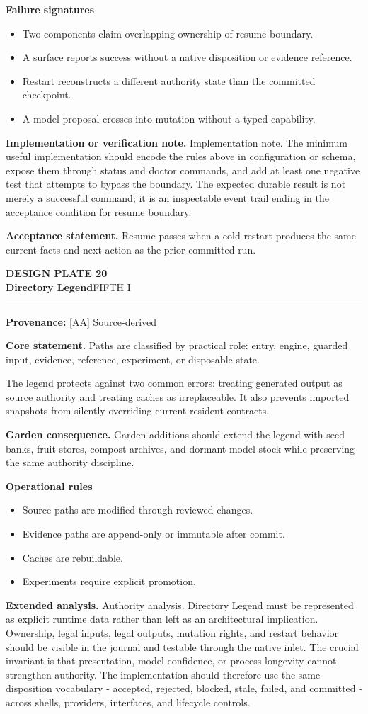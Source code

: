 \documentclass[10pt,letterpaper,oneside]{article}
\newcommand{\prov}[1]{\textcolor{gardenBlue}{\sffamily\footnotesize\textbf{Provenance:} #1}}
\newcommand{\platetitle}[3]{%
  \begin{minipage}[t][0.54in][t]{\textwidth}
  {\sffamily\bfseries\color{gardenDeep}\fontsize{9}{10}\selectfont DESIGN PLATE #1}\\[-1pt]
  {\sffamily\bfseries\color{gardenInk}\fontsize{16.5}{18}\selectfont #2}\hfill{\sffamily\color{gardenGreen}\large #3}
  \end{minipage}\vspace{-2pt}\hrule\vspace{5pt}}
\begin{document}
\textbf{Failure signatures}
\begin{itemize}
\item Two components claim overlapping ownership of resume boundary.
\item A surface reports success without a native disposition or evidence reference.
\item Restart reconstructs a different authority state than the committed checkpoint.
\item A model proposal crosses into mutation without a typed capability.
\end{itemize}
\textbf{Implementation or verification note.} Implementation note. The minimum useful implementation should encode the rules above in configuration or schema, expose them through status and doctor commands, and add at least one negative test that attempts to bypass the boundary. The expected durable result is not merely a successful command; it is an inspectable event trail ending in the acceptance condition for resume boundary.

\begin{acceptbox}
\textbf{Acceptance statement.} Resume passes when a cold restart produces the same current facts and next action as the prior committed run.
\end{acceptbox}
\newpage
\platetitle{20}{Directory Legend}{FIFTH I}
\prov{[AA] Source-derived}
\fontsize{8.85}{10.45}\selectfont
\begin{corebox}
\textbf{Core statement.} Paths are classified by practical role: entry, engine, guarded input, evidence, reference, experiment, or disposable state.
\end{corebox}
The legend protects against two common errors: treating generated output as source authority and treating caches as irreplaceable. It also prevents imported snapshots from silently overriding current resident contracts.

\textbf{Garden consequence.} Garden additions should extend the legend with seed banks, fruit stores, compost archives, and dormant model stock while preserving the same authority discipline.

\textbf{Operational rules}
\begin{itemize}
\item Source paths are modified through reviewed changes.
\item Evidence paths are append-only or immutable after commit.
\item Caches are rebuildable.
\item Experiments require explicit promotion.
\end{itemize}
\textbf{Extended analysis.} Authority analysis. Directory Legend must be represented as explicit runtime data rather than left as an architectural implication. Ownership, legal inputs, legal outputs, mutation rights, and restart behavior should be visible in the journal and testable through the native inlet. The crucial invariant is that presentation, model confidence, or process longevity cannot strengthen authority. The implementation should therefore use the same disposition vocabulary - accepted, rejected, blocked, stale, failed, and committed - across shells, providers, interfaces, and lifecycle controls.
\end{document}
